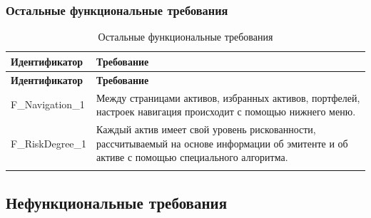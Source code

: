 \documentclass[a4paper, 14pt]{article}
\begin{document}
\subsubsection{Остальные функциональные требования}

\begin{longtable}{| p{} | p{} |}
    \hline
    \textbf{Идентификатор}          & \textbf{Требование}                                                                                                                                                                \\
    \hline
    \endfirsthead
    \hline
    \textbf{Идентификатор}          & \textbf{Требование}                                                                                                                                                                \\
    \hline
    \endhead

    F\_Navigation\_1                & Между страницами активов, избранных активов, портфелей, настроек навигация происходит с помощью нижнего меню.                                                                 \\ \hline
    F\_RiskDegree\_1    & Каждый актив имеет свой уровень рискованности, рассчитываемый на основе информации об эмитенте и об активе с помощью специального алгоритма.                                                  \\ \hline

    \caption{Остальные функциональные требования}
\end{longtable}

\subsection{Нефункциональные требования}
\end{document}

